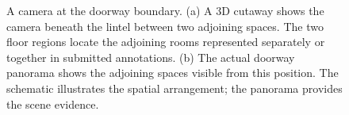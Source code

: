 \begin{figure}[t]
\centering
\setcounter{subfigure}{0}
\begin{minipage}{155mm}
\centering
{}%
\hfill%

\end{minipage}
\caption{A camera at the doorway boundary. (a) A 3D cutaway shows the camera beneath the lintel between two adjoining spaces. The two floor regions locate the adjoining rooms represented separately or together in submitted annotations. (b) The actual doorway panorama shows the adjoining spaces visible from this position. The schematic illustrates the spatial arrangement; the panorama provides the scene evidence.}
\label{fig:doorway-scene}
\end{figure}
